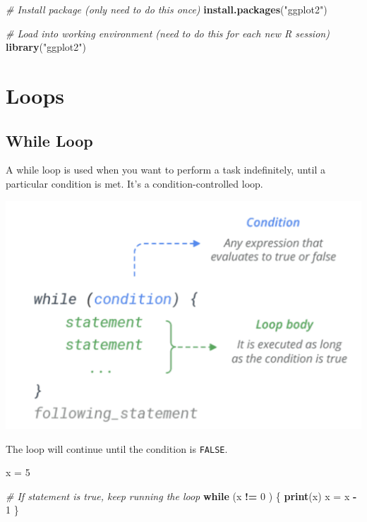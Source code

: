 \documentclass[
]{book}
\newenvironment{Shaded}{\begin{snugshade}}{\end{snugshade}}
\newcommand{\CommentTok}[1]{\textcolor[rgb]{0.56,0.35,0.01}{\textit{#1}}}
\newcommand{\ControlFlowTok}[1]{\textcolor[rgb]{0.13,0.29,0.53}{\textbf{#1}}}
\newcommand{\DecValTok}[1]{\textcolor[rgb]{0.00,0.00,0.81}{#1}}
\newcommand{\KeywordTok}[1]{\textcolor[rgb]{0.13,0.29,0.53}{\textbf{#1}}}
\newcommand{\NormalTok}[1]{#1}
\newcommand{\OperatorTok}[1]{\textcolor[rgb]{0.81,0.36,0.00}{\textbf{#1}}}
\newcommand{\StringTok}[1]{\textcolor[rgb]{0.31,0.60,0.02}{#1}}
\begin{document}
\begin{Shaded}
\begin{Highlighting}[]
\CommentTok{# Install package (only need to do this once)}
\KeywordTok{install.packages}\NormalTok{(}\StringTok{"ggplot2"}\NormalTok{)}

\CommentTok{# Load into working environment (need to do this for each new R session)}
\KeywordTok{library}\NormalTok{(}\StringTok{"ggplot2"}\NormalTok{)}
\end{Highlighting}
\end{Shaded}

\hypertarget{loops}{%
\chapter{Loops}\label{loops}}

\hypertarget{while-loop}{%
\section{While Loop}\label{while-loop}}

A while loop is used when you want to perform a task indefinitely, until a particular condition is met. It's a condition-controlled loop.

\includegraphics[width=14.5in]{images/WhileLoop}

The loop will continue until the condition is \texttt{FALSE}.

\begin{Shaded}
\begin{Highlighting}[]
\NormalTok{x =}\StringTok{ }\DecValTok{5}

\CommentTok{# If statement is true, keep running the loop }
\ControlFlowTok{while}\NormalTok{ (x }\OperatorTok{!=}\StringTok{ }\DecValTok{0}\NormalTok{ ) \{}
  \KeywordTok{print}\NormalTok{(x)}
\NormalTok{  x =}\StringTok{ }\NormalTok{x }\OperatorTok{-}\StringTok{ }\DecValTok{1}
\NormalTok{\}}
\end{Highlighting}
\end{Shaded}
\end{document}
